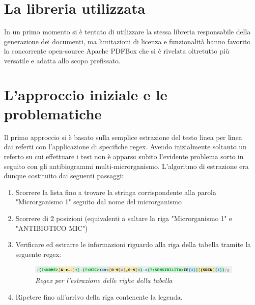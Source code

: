 \section{La libreria utilizzata}
In un primo momento si è tentato di utilizzare la stessa libreria responsabile della generazione dei documenti, ma limitazioni di licenza e funzionalità hanno favorito la concorrente open-source Apache PDFBox che si è rivelata oltretutto più versatile e adatta allo scopo prefissato.
\section{L'approccio iniziale e le problematiche}
Il primo approccio si è basato sulla semplice estrazione del testo linea per linea dai referti con l'applicazione di specifiche regex. 
Avendo inizialmente soltanto un referto su cui effettuare i test non è apparso subito l'evidente problema sorto in seguito con gli antibiogrammi multi-microrganismo.
L'algoritmo di estrazione era dunque costituito dai seguenti passaggi:
\begin{enumerate}
\item Scorrere la lista fino a trovare la stringa corrispondente alla parola "Microrganismo 1" seguito dal nome del microrganismo
\item Scorrere di 2 posizioni (equivalenti a saltare la riga "Microrganismo 1" e "ANTIBIOTICO MIC")
\newpage
\item Verificare ed estrarre le informazioni riguardo alla riga della tabella tramite la seguente regex:
\begin{figure}[h!]
	\centering
	\includegraphics[width=.99\columnwidth]{images/regex.png}
	\caption{\textit{Regex per l'estrazione delle righe della tabella}}
	\label{fig:content_multi_1}
\end{figure}
\item Ripetere fino all'arrivo della riga contenente la legenda.
\end{enumerate}

